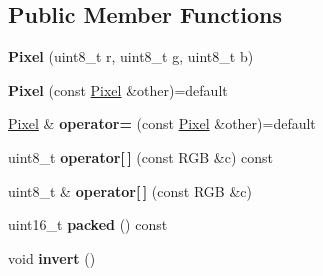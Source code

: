 \subsection*{Public Member Functions}
\begin{DoxyCompactItemize}
\item 
{\bfseries Pixel} (uint8\+\_\+t r, uint8\+\_\+t g, uint8\+\_\+t b)\hypertarget{class_pixel_acfc5df218e6b318edcb09cdf6727c529}{}\label{class_pixel_acfc5df218e6b318edcb09cdf6727c529}

\item 
{\bfseries Pixel} (const \hyperlink{class_pixel}{Pixel} \&other)=default\hypertarget{class_pixel_a787fa2f52c2c61b3ad51a0ffe80b6a25}{}\label{class_pixel_a787fa2f52c2c61b3ad51a0ffe80b6a25}

\item 
\hyperlink{class_pixel}{Pixel} \& {\bfseries operator=} (const \hyperlink{class_pixel}{Pixel} \&other)=default\hypertarget{class_pixel_ac00753b6afb5bf23405c18f1be0ba7b8}{}\label{class_pixel_ac00753b6afb5bf23405c18f1be0ba7b8}

\item 
uint8\+\_\+t {\bfseries operator\mbox{[}$\,$\mbox{]}} (const R\+GB \&c) const \hypertarget{class_pixel_a53aaf31ca813603015645ed426c0e773}{}\label{class_pixel_a53aaf31ca813603015645ed426c0e773}

\item 
uint8\+\_\+t \& {\bfseries operator\mbox{[}$\,$\mbox{]}} (const R\+GB \&c)\hypertarget{class_pixel_aee26e313f33828aad54775818acb7f4e}{}\label{class_pixel_aee26e313f33828aad54775818acb7f4e}

\item 
uint16\+\_\+t {\bfseries packed} () const \hypertarget{class_pixel_a3fb07455636711f0be6bcc293e244482}{}\label{class_pixel_a3fb07455636711f0be6bcc293e244482}

\item 
void {\bfseries invert} ()\hypertarget{class_pixel_a1159eae28181f9bd41ac10833122a7d2}{}\label{class_pixel_a1159eae28181f9bd41ac10833122a7d2}

\end{DoxyCompactItemize}
